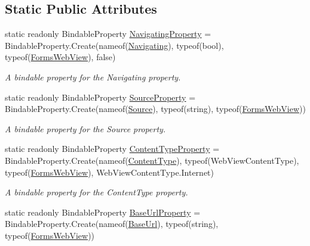\subsection*{Static Public Attributes}
\begin{DoxyCompactItemize}
\item 
static readonly Bindable\+Property \hyperlink{class_xam_1_1_plugin_1_1_web_view_1_1_abstractions_1_1_forms_web_view_a77bf69030f0aac583e6fe7f61603fcd6}{Navigating\+Property} = Bindable\+Property.\+Create(nameof(\hyperlink{class_xam_1_1_plugin_1_1_web_view_1_1_abstractions_1_1_forms_web_view_a63f9c0f6a44497e9febc0b4922cbe838}{Navigating}), typeof(bool), typeof(\hyperlink{class_xam_1_1_plugin_1_1_web_view_1_1_abstractions_1_1_forms_web_view}{Forms\+Web\+View}), false)
\begin{DoxyCompactList}\small\item\em A bindable property for the Navigating property. \end{DoxyCompactList}\item 
static readonly Bindable\+Property \hyperlink{class_xam_1_1_plugin_1_1_web_view_1_1_abstractions_1_1_forms_web_view_a5b560fec025fb9b9a1c7ebd638cfceac}{Source\+Property} = Bindable\+Property.\+Create(nameof(\hyperlink{class_xam_1_1_plugin_1_1_web_view_1_1_abstractions_1_1_forms_web_view_a67fca633a4ffb71e594925ba81250c6b}{Source}), typeof(string), typeof(\hyperlink{class_xam_1_1_plugin_1_1_web_view_1_1_abstractions_1_1_forms_web_view}{Forms\+Web\+View}))
\begin{DoxyCompactList}\small\item\em A bindable property for the Source property. \end{DoxyCompactList}\item 
static readonly Bindable\+Property \hyperlink{class_xam_1_1_plugin_1_1_web_view_1_1_abstractions_1_1_forms_web_view_a96ddcfe6c508d10563ec47269ca77970}{Content\+Type\+Property} = Bindable\+Property.\+Create(nameof(\hyperlink{class_xam_1_1_plugin_1_1_web_view_1_1_abstractions_1_1_forms_web_view_a7066440f9f0f094ba9266c43e1d940b3}{Content\+Type}), typeof(Web\+View\+Content\+Type), typeof(\hyperlink{class_xam_1_1_plugin_1_1_web_view_1_1_abstractions_1_1_forms_web_view}{Forms\+Web\+View}), Web\+View\+Content\+Type.\+Internet)
\begin{DoxyCompactList}\small\item\em A bindable property for the Content\+Type property. \end{DoxyCompactList}\item 
static readonly Bindable\+Property \hyperlink{class_xam_1_1_plugin_1_1_web_view_1_1_abstractions_1_1_forms_web_view_ae7461a441fcc73e83e96b83342b592be}{Base\+Url\+Property} = Bindable\+Property.\+Create(nameof(\hyperlink{class_xam_1_1_plugin_1_1_web_view_1_1_abstractions_1_1_forms_web_view_aa31fde920a7f9a83919ce02291fec4c6}{Base\+Url}), typeof(string), typeof(\hyperlink{class_xam_1_1_plugin_1_1_web_view_1_1_abstractions_1_1_forms_web_view}{Forms\+Web\+View}))

\end{DoxyCompactItemize}
